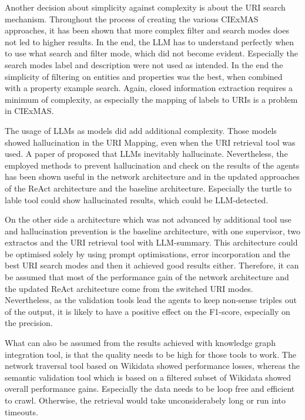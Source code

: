 \documentclass[a4paper,oneside,bibliography=totoc]{scrbook}
\begin{document}
Another decision about simplicity against complexity is about the URI search mechanism. Throughout the process of creating the various CIExMAS approaches, it has been shown that more complex filter and search modes does not led to higher results. In the end, the \ac{LLM} has to understand perfectly when to use what search and filter mode, which did not become evident. Especially the search modes label and description were not used as intended. In the end the simplicity of filtering on entities and properties was the best, when combined with a property example search. Again, closed information extraction requires a minimum of complexity, as especially the mapping of labels to URIs is a problem in CIExMAS.

The usage of LLMs as models did add additional complexity. Those models showed hallucination in the URI Mapping, even when the URI retrieval tool was used. A paper of \citet{Xu2025} proposed that \acp{LLM} inevitably hallucinate. Nevertheless, the employed methods to prevent hallucination and check on the results of the agents has been shown useful in the network architecture and in the updated approaches of the ReAct architecture and the baseline architecture. Especially the turtle to lable tool could show hallucinated results, which could be \ac{LLM}-detected.

On the other side a architecture which was not advanced by additional tool use and hallucination prevention is the baseline architecture, with one supervisor, two extractos and the URI retrieval tool with \ac{LLM}-summary. This architecture could be optimised solely by using prompt optimisations, error incorporation and the best URI search modes and then it achieved good results either. Therefore, it can be assumed that most of the performance gain of the network architecture and the updated ReAct architecture come from the switched URI modes. Nevertheless, as the validation tools lead the agents to keep non-sense triples out of the output, it is likely to have a positive effect on the F1-score, especially on the precision.

What can also be assumed from the results achieved with knowledge graph integration tool, is that the quality needs to be high for those tools to work. The network traversal tool based on Wikidata showed performance losses, whereas the semantic validation tool which is based on a filtered subset of Wikidata showed overall performance gains. Especially the data needs to be loop free and efficient to crawl. Otherwise, the retrieval would take unconsiderabely long or run into timeouts.
\end{document}
